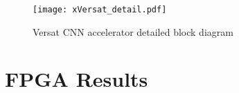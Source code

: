 \documentclass[twocolumn]{../../submodules/TEX/document/pb/pb}
\begin{document}
\begin{figure*}[t]
  \begin{center}
    \texttt{[image: xVersat\_detail.pdf]}
    \caption{Versat CNN accelerator detailed block diagram}
    \label{fig:xVersat_detail}
  \end{center}
\end{figure*}

\section*{FPGA Results}



\end{document}
